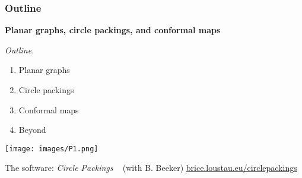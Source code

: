   
\begin{frame}
\frametitle{Outline}
    
\begin{center}
{\large \bfseries Planar graphs, circle packings, and conformal maps}
\end{center}
    

\bigskip \bigskip

\begin{minipage}{0.40\textwidth}

\emph{Outline.}
\bigskip

\begin{enumerate}[1., itemsep=1.0ex]
\item Planar graphs
\item Circle packings
\item Conformal maps
\item Beyond
\end{enumerate}
\end{minipage}%
\hfill \pause
\begin{minipage}{0.60\textwidth}

\begin{center}
\texttt{[image: images/P1.png]}
\end{center}

The software: \emph{Circle Packings} ~ (with B. Beeker) \newline
\href{https://www.brice.loustau.eu/circlepackings/indexen.html}{brice.loustau.eu/circlepackings} 
\end{minipage}%



\end{frame}

